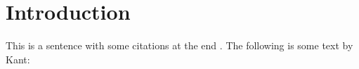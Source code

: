 \section{Introduction}
This is a sentence with some citations at the end \parencite{ramachandran2021,saito2018}.
The following is some text by Kant: \kant[3]
